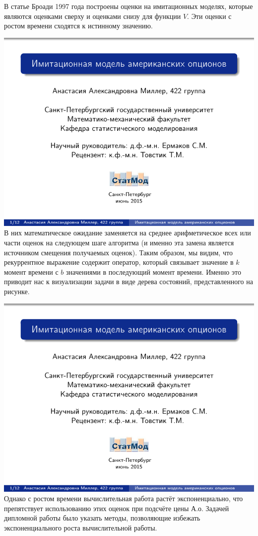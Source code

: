 \documentclass[14pt,a4paper]{extarticle}
\begin{document}
В статье Броади 1997 года построены оценки на имитационных моделях, которые являются оценками сверху и оценками снизу для функции $V$. Эти оценки с ростом времени сходятся к истинному значению. 

\includegraphics[page=\theslidenumber, width=\textwidth]{8th-semester-presentation.pdf}
В них математическое ожидание заменяется на среднее арифметическое всех или части оценок на следующем шаге алгоритма (и именно эта замена является источником смещения получаемых оценок). Таким образом, мы видим, что рекуррентное выражение содержит оператор, который связывает значение в $k$ момент времени с $b$ значениями в последующий момент времени. Именно это приводит нас к визуализации задачи в виде дерева состояний, представленного на рисунке.

\includegraphics[page=\theslidenumber, width=\textwidth]{8th-semester-presentation.pdf}
Однако с ростом времени вычислительная работа растёт экспоненциально, что препятствует использованию этих оценок при подсчёте цены А.о. Задачей дипломной работы было указать методы, позволяющие избежать экспоненциального роста вычислительной работы. 
\end{document}
